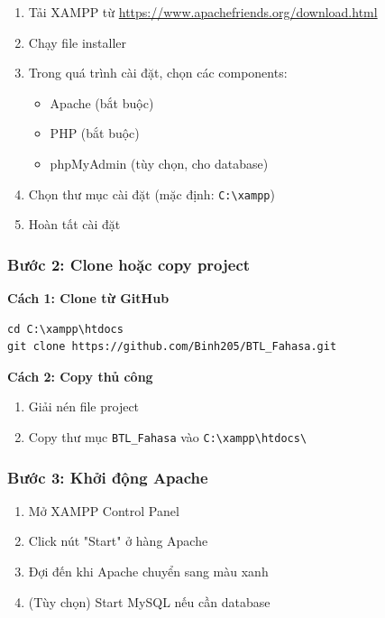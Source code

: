 \begin{enumerate}
    \item Tải XAMPP từ \url{https://www.apachefriends.org/download.html}
    \item Chạy file installer
    \item Trong quá trình cài đặt, chọn các components:
    \begin{itemize}
        \item Apache (bắt buộc)
        \item PHP (bắt buộc)
        \item phpMyAdmin (tùy chọn, cho database)
    \end{itemize}
    \item Chọn thư mục cài đặt (mặc định: \texttt{C:\textbackslash xampp})
    \item Hoàn tất cài đặt
\end{enumerate}

\subsubsection{Bước 2: Clone hoặc copy project}

\textbf{Cách 1: Clone từ GitHub}
\begin{verbatim}
cd C:\xampp\htdocs
git clone https://github.com/Binh205/BTL_Fahasa.git
\end{verbatim}

\textbf{Cách 2: Copy thủ công}
\begin{enumerate}
    \item Giải nén file project
    \item Copy thư mục \texttt{BTL\_Fahasa} vào \texttt{C:\textbackslash xampp\textbackslash htdocs\textbackslash}
\end{enumerate}

\subsubsection{Bước 3: Khởi động Apache}

\begin{enumerate}
    \item Mở XAMPP Control Panel
    \item Click nút "Start" ở hàng Apache
    \item Đợi đến khi Apache chuyển sang màu xanh
    \item (Tùy chọn) Start MySQL nếu cần database
\end{enumerate}

